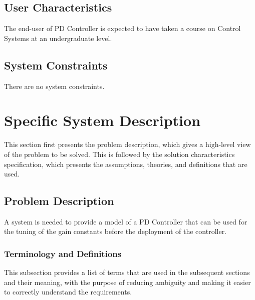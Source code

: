 \documentclass[12pt]{article}
\begin{document}
\subsection{User Characteristics}
\label{Sec:UserChars}
The end-user of PD Controller is expected to have taken a course on Control Systems at an undergraduate level.

\subsection{System Constraints}
\label{Sec:SysConstraints}
There are no system constraints.

\section{Specific System Description}
\label{Sec:SpecSystDesc}
This section first presents the problem description, which gives a high-level view of the problem to be solved. This is followed by the solution characteristics specification, which presents the assumptions, theories, and definitions that are used.

\subsection{Problem Description}
\label{Sec:ProbDesc}
A system is needed to provide a model of a PD Controller that can be used for the tuning of the gain constants before the deployment of the controller.

\subsubsection{Terminology and Definitions}
\label{Sec:TermDefs}
This subsection provides a list of terms that are used in the subsequent sections and their meaning, with the purpose of reducing ambiguity and making it easier to correctly understand the requirements.
\end{document}
